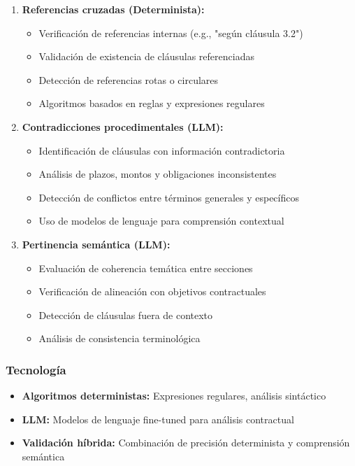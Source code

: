 \documentclass[12pt,a4paper]{article}
\begin{document}
\begin{enumerate}[leftmargin=*]
    \item \textbf{Referencias cruzadas (Determinista):}
    \begin{itemize}
        \item Verificación de referencias internas (e.g., "según cláusula 3.2")
        \item Validación de existencia de cláusulas referenciadas
        \item Detección de referencias rotas o circulares
        \item Algoritmos basados en reglas y expresiones regulares
    \end{itemize}
    
    \item \textbf{Contradicciones procedimentales (LLM):}
    \begin{itemize}
        \item Identificación de cláusulas con información contradictoria
        \item Análisis de plazos, montos y obligaciones inconsistentes
        \item Detección de conflictos entre términos generales y específicos
        \item Uso de modelos de lenguaje para comprensión contextual
    \end{itemize}
    
    \item \textbf{Pertinencia semántica (LLM):}
    \begin{itemize}
        \item Evaluación de coherencia temática entre secciones
        \item Verificación de alineación con objetivos contractuales
        \item Detección de cláusulas fuera de contexto
        \item Análisis de consistencia terminológica
    \end{itemize}
\end{enumerate}

\subsubsection{Tecnología}

\begin{itemize}[leftmargin=*]
    \item \textbf{Algoritmos deterministas:} Expresiones regulares, análisis sintáctico
    \item \textbf{LLM:} Modelos de lenguaje fine-tuned para análisis contractual
    \item \textbf{Validación híbrida:} Combinación de precisión determinista y comprensión semántica
\end{itemize}
\end{document}
